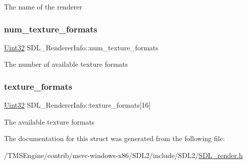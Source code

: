 The name of the renderer \mbox{\label{struct_s_d_l___renderer_info_acdec165b2053b914313f5996983ec6b8}} 
\subsubsection{\texorpdfstring{num\+\_\+texture\+\_\+formats}{num\_texture\_formats}}
{\footnotesize\ttfamily \hyperlink{_s_d_l__stdinc_8h_add440eff171ea5f55cb00c4a9ab8672d}{Uint32} S\+D\+L\+\_\+\+Renderer\+Info\+::num\+\_\+texture\+\_\+formats}

The number of available texture formats \mbox{\label{struct_s_d_l___renderer_info_a88450f9d48e593ec4571e3ba7cc3427d}} 
\subsubsection{\texorpdfstring{texture\+\_\+formats}{texture\_formats}}
{\footnotesize\ttfamily \hyperlink{_s_d_l__stdinc_8h_add440eff171ea5f55cb00c4a9ab8672d}{Uint32} S\+D\+L\+\_\+\+Renderer\+Info\+::texture\+\_\+formats\mbox{[}16\mbox{]}}

The available texture formats 

The documentation for this struct was generated from the following file\+:\begin{DoxyCompactItemize}
\item 
/\+T\+M\+S\+Engine/contrib/msvc-\/windows-\/x86/\+S\+D\+L2/include/\+S\+D\+L2/\hyperlink{_s_d_l__render_8h}{S\+D\+L\+\_\+render.\+h}\end{DoxyCompactItemize}
